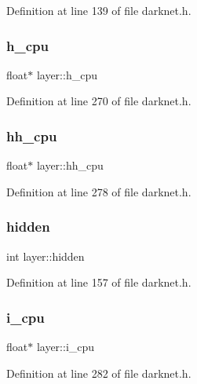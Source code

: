 Definition at line 139 of file darknet.\+h.

\mbox{\label{structlayer_aff93d520e69e75d6aa104a687d5ab21e}} 
\subsubsection{\texorpdfstring{h\_cpu}{h\_cpu}}
{\footnotesize\ttfamily float$\ast$ layer\+::h\+\_\+cpu}



Definition at line 270 of file darknet.\+h.

\mbox{\label{structlayer_af62005e5700299a59c76dafe7bb00529}} 
\subsubsection{\texorpdfstring{hh\_cpu}{hh\_cpu}}
{\footnotesize\ttfamily float$\ast$ layer\+::hh\+\_\+cpu}



Definition at line 278 of file darknet.\+h.

\mbox{\label{structlayer_a10071bf2848df19c845b55fc575dcd9c}} 
\subsubsection{\texorpdfstring{hidden}{hidden}}
{\footnotesize\ttfamily int layer\+::hidden}



Definition at line 157 of file darknet.\+h.

\mbox{\label{structlayer_a3cbe33860e4b1605034034f9dbddc227}} 
\subsubsection{\texorpdfstring{i\_cpu}{i\_cpu}}
{\footnotesize\ttfamily float$\ast$ layer\+::i\+\_\+cpu}



Definition at line 282 of file darknet.\+h.

